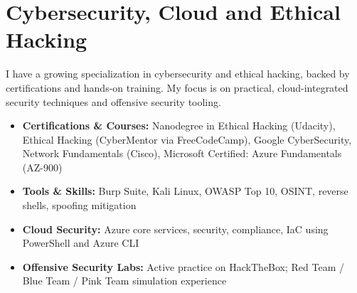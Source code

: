 \section*{Cybersecurity, Cloud and Ethical Hacking}
I have a growing specialization in cybersecurity and ethical hacking, backed by certifications and hands-on training. My focus is on practical, cloud-integrated security techniques and offensive security tooling.

\begin{itemize}
  \item \textbf{Certifications \& Courses:}
    Nanodegree in Ethical Hacking (Udacity), Ethical Hacking (CyberMentor via FreeCodeCamp), Google CyberSecurity, Network Fundamentals (Cisco), Microsoft Certified: Azure Fundamentals (AZ-900)
  \item \textbf{Tools \& Skills:}
    Burp Suite, Kali Linux, OWASP Top 10, OSINT, reverse shells, spoofing mitigation
  \item \textbf{Cloud Security:}
    Azure core services, security, compliance, IaC using PowerShell and Azure CLI
  \item \textbf{Offensive Security Labs:}
    Active practice on HackTheBox; Red Team / Blue Team / Pink Team simulation experience
\end{itemize}
